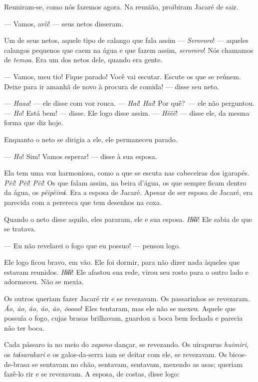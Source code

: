Reuniram-se, como nós fazemos agora. Na reunião, proibiram Jacaré de sair. 

--- Vamos, avô! --- seus netos disseram. 

Um de seus netos, aquele tipo de calango que fala
 assim --- \textit{Serororo}! --- aqueles calangos pequenos que caem na água e
 que fazem assim, \textit{serororo}! Nós chamamos de \textit{temoa}. Era um
 dos netos dele, quando era gente. 

--- Vamos, meu tio! Fique parado! Você vai escutar. Escute os que se
 reúnem. Deixe para ir amanhã de novo à procura de comida! --- disse seu
 neto.

--- \textit{Haaa}! --- ele disse com voz rouca. --- \textit{Hai}! \textit{Hai}! Por quê?~--- ele não perguntou. --- \textit{Ho}! Está bem! --- disse. Ele logo disse assim. --- \textit{Hëëë}! --- disse ele, da mesma forma que diz hoje. 

Enquanto o neto se dirigia a ele, ele permaneceu parado. 

--- \textit{Ho}! Sim! Vamos esperar! --- disse à sua esposa. 

Ela tem uma voz harmoniosa, como a que se escuta nas cabeceiras dos
igarapés. \textit{Pẽi}! \textit{Pẽi}! \textit{Pẽi}! Os que falam assim, na beira d'água, os
que sempre ficam dentro da água, os \textit{pëipëimɨ}. Era a esposa de
Jacaré. Apesar de ser esposa de Jacaré, era parecida com a perereca que
tem desenhos na coxa.

Quando o neto disse aquilo, eles pararam, ele e sua esposa. \textit{Hɨ̃ɨɨ}!
Ele sabia de que se tratava. 

--- Eu não revelarei o fogo que eu possuo! --- pensou logo. 

Ele logo ficou bravo, em vão. Ele foi dormir, para não dizer nada
àqueles que estavam reunidos. \textit{Hɨ̃ɨɨ}! Ele afastou sua rede, virou
seu rosto para o outro lado e adormeceu. Não se mexia. 

Os outros queriam fazer Jacaré rir e se revezavam. Os passarinhos se
revezaram. \textit{Ão, ão, ão, ão, ão, õoooo}! Eles tentaram, mas ele não
se mexeu. Aquele que possuía o fogo, cujas brasas brilhavam, guardou a
boca bem fechada e parecia não ter boca. 

Cada pássaro ia no meio do \textit{xapono} dançar, se revezando.
Os uirapurus \textit{huimiri}, os \textit{taɨsarakari} e os galos-da-serra iam se deitar
com ele, se revezavam. Os bicos-de-brasa se sentavam no chão, sentavam,
sentavam, mexendo as asas; queriam fazê-lo rir e se revezavam. A esposa,
de costas, disse logo: 


